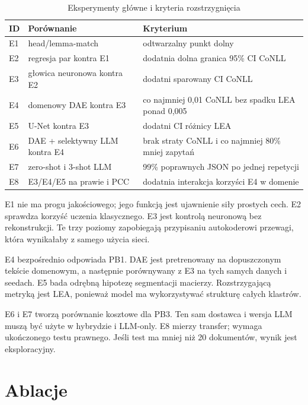\begin{table}[htbp]
  \centering
  \caption{Eksperymenty główne i kryteria rozstrzygnięcia}
  \label{tab:eksperymenty-glowne}
  \begin{tabular}{p{}p{}p{}}
    \toprule
    ID & Porównanie & Kryterium \\
    \midrule
    E1 & head/lemma-match & odtwarzalny punkt dolny \\
    E2 & regresja par kontra E1 & dodatnia dolna granica 95\% CI CoNLL \\
    E3 & głowica neuronowa kontra E2 & dodatni sparowany CI CoNLL \\
    E4 & domenowy DAE kontra E3 & co najmniej 0,01 CoNLL bez spadku LEA ponad 0,005 \\
    E5 & U-Net kontra E3 & dodatni CI różnicy LEA \\
    E6 & DAE + selektywny LLM kontra E4 & brak straty CoNLL i co najmniej 80\% mniej zapytań \\
    E7 & zero-shot i 3-shot LLM & 99\% poprawnych JSON po jednej repetycji \\
    E8 & E3/E4/E5 na prawie i PCC & dodatnia interakcja korzyści E4 w domenie \\
    \bottomrule
  \end{tabular}
\end{table}

E1 nie ma progu jakościowego; jego funkcją jest ujawnienie siły prostych cech. E2 sprawdza korzyść uczenia klasycznego. E3 jest kontrolą neuronową bez rekonstrukcji. Te trzy poziomy zapobiegają przypisaniu autokoderowi przewagi, która wynikałaby z samego użycia sieci.

E4 bezpośrednio odpowiada PB1. DAE jest pretrenowany na dopuszczonym tekście domenowym, a następnie porównywany z E3 na tych samych danych i seedach. E5 bada odrębną hipotezę segmentacji macierzy. Rozstrzygającą metryką jest LEA, ponieważ model ma wykorzystywać strukturę całych klastrów.

E6 i E7 tworzą porównanie kosztowe dla PB3. Ten sam dostawca i wersja LLM muszą być użyte w hybrydzie i LLM-only. E8 mierzy transfer; wymaga ukończonego testu prawnego. Jeśli test ma mniej niż 20 dokumentów, wynik jest eksploracyjny.

\section{Ablacje}
\label{sec:ablacje}

